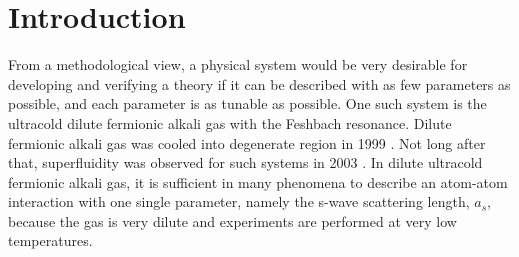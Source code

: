 
\chapter{Introduction}
From  a methodological view, a physical system  would be very desirable for developing and  verifying a theory  if  it can be described with  as few parameters as possible,  and each parameter is as tunable as possible. One such system is the ultracold dilute fermionic alkali gas with the Feshbach resonance.  Dilute fermionic alkali gas was cooled into degenerate region in 1999 \cite{DeMarco1999}. Not long after that,  superfluidity was observed for such systems in 2003 \cite{Regal2003}.  In dilute ultracold fermionic alkali gas, it is sufficient in many phenomena to describe an atom-atom interaction with one single parameter, namely the s-wave scattering length, $a_{s}$, because the gas is very dilute and experiments are performed at very low temperatures.       

